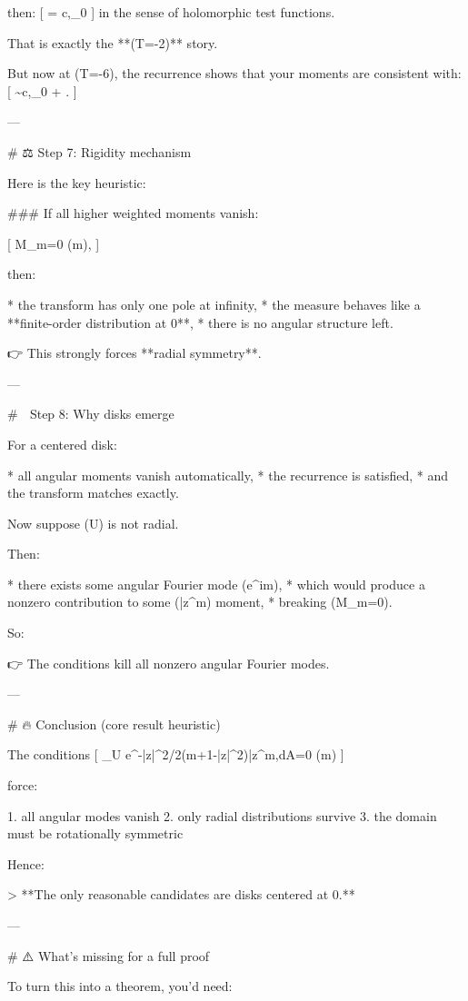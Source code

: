 then:
[
\mu = c,\delta_0
]
in the sense of holomorphic test functions.

That is exactly the **(T=-2)** story.

But now at (T=-6), the recurrence shows that your moments are consistent with:
[
\mu \sim c,\delta_0 + .
]

---

# ⚖️ Step 7: Rigidity mechanism

Here is the key heuristic:

### If all higher weighted moments vanish:

[
M_m=0 \quad (m),
]

then:

* the transform has only one pole at infinity,
* the measure behaves like a **finite-order distribution at 0**,
* there is no angular structure left.

👉 This strongly forces **radial symmetry**.

---

# 🧩 Step 8: Why disks emerge

For a centered disk:

* all angular moments vanish automatically,
* the recurrence is satisfied,
* and the transform matches exactly.

Now suppose (U) is not radial.

Then:

* there exists some angular Fourier mode (e^{im\theta}),
* which would produce a nonzero contribution to some (\bar z^m) moment,
* breaking (M_m=0).

So:

👉 The conditions kill all nonzero angular Fourier modes.

---

# 🔥 Conclusion (core result heuristic)

The conditions
[
\int_U e^{-|z|^2/2}(m+1-|z|^2)\bar z^m,dA=0 \quad (m)
]

force:

1. all angular modes vanish
2. only radial distributions survive
3. the domain must be rotationally symmetric

Hence:

> **The only reasonable candidates are disks centered at 0.**

---

# ⚠️ What’s missing for a full proof

To turn this into a theorem, you’d need:

